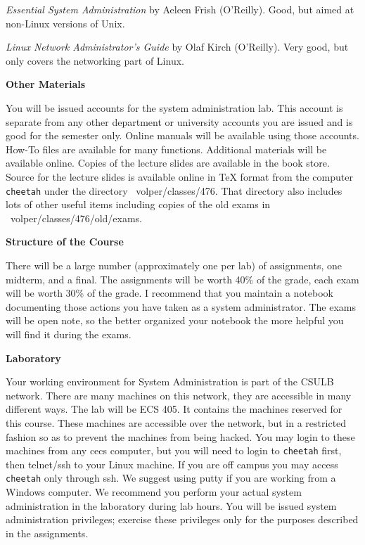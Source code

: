 
{\it Essential System Administration} by Aeleen Frish (O'Reilly).
Good, but aimed at non-Linux versions of Unix.

{\it Linux Network Administrator's Guide} by Olaf Kirch (O'Reilly).
Very good, but only covers the networking part of Linux.

\vskip 5pt
\centerline{\bf Other Materials}

You will be issued accounts for the system administration lab.
This account is separate from any other department or university
accounts you are issued and is good for the semester only.
Online manuals will be available using those accounts.
How-To files are available for many functions.
Additional materials will be available online.
Copies of the lecture slides are available in the book store.
Source for the lecture slides is available online in TeX format
from the computer {\tt{}cheetah} under the directory
{\ltt{}~volper/classes/476}.
That directory also includes lots of other useful items including copies
of the old exams in {\ltt{}~volper/classes/476/old/exams}.

\vskip 5pt
\centerline{\bf Structure of the Course}
 
There will be a large number (approximately one per lab) of 
assignments, one midterm, and a final.
The assignments will be worth 40\% of the grade,
each exam will be worth 30\% of the grade.
I recommend that you maintain a notebook documenting those actions
you have taken as a system administrator.
The exams will be open note, so the better organized your notebook
the more helpful you will find it during the exams.

\vfill\eject
\centerline{\bf Laboratory}

Your working environment for System Administration is part of the CSULB network.
There are many machines on this network, they are accessible in
many different ways.
The lab will be ECS 405. It contains the machines reserved for this course.
These machines are accessible over the network,
but in a restricted fashion so as to prevent the machines from being hacked.
You may login to these machines from any cecs computer,
but you will need to login to {\tt cheetah}
first, then telnet/ssh to your Linux machine.
If you are off campus you may access {\tt cheetah} only through ssh.
We suggest using putty if you are working from a Windows computer.
We recommend you perform your actual system administration in the laboratory
during lab hours.
You will be issued system administration privileges;
exercise these privileges only for the purposes described in the assignments.

